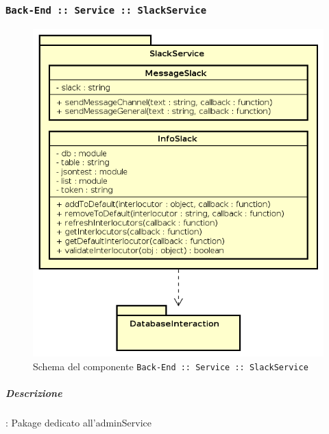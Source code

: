 \documentclass[../DefinizioneDiProdotto_v3.0.0.tex]{subfiles}
\begin{document}
\subsubsection{\texttt{Back-End :: Service :: SlackService}}
\begin{figure}[!h]
	\centering
	\includegraphics[scale=0.7]{Architettura/Back-End/Service/SlackService.png}
	\caption{Schema del componente \texttt{Back-End :: Service :: SlackService}}
\end{figure}
\subparagraph{Descrizione}: Pakage dedicato all'adminService
\end{document}
